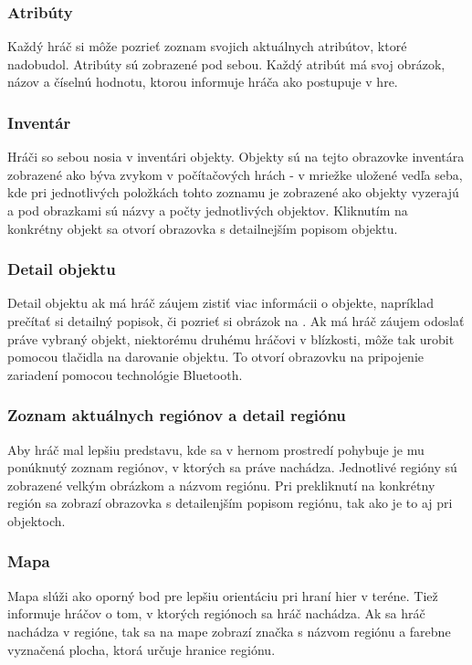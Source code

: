 \subsubsection{Atribúty}
Každý hráč si môže pozrieť zoznam svojich aktuálnych atribútov, ktoré nadobudol. Atribúty sú zobrazené pod sebou. Každý atribút má svoj obrázok, názov a číselnú hodnotu, ktorou informuje hráča ako postupuje v hre.

\subsubsection{Inventár}
Hráči so sebou nosia v inventári objekty. Objekty sú na tejto obrazovke inventára zobrazené ako býva zvykom v počítačových hrách - v mriežke uložené vedľa seba, kde pri jednotlivých položkách tohto zoznamu je zobrazené ako objekty vyzerajú a pod obrazkami sú názvy a počty jednotlivých objektov. Kliknutím na konkrétny objekt sa otvorí obrazovka s detailnejším popisom objektu.

\subsubsection{Detail objektu}
Detail objektu  ak má hráč záujem zistiť viac informácii o objekte, napríklad prečítať si detailný popisok, či pozrieť si obrázok na . Ak má hráč záujem odoslať práve vybraný objekt, niektorému druhému hráčovi v blízkosti, môže tak urobit pomocou tlačidla na darovanie objektu. To otvorí obrazovku na pripojenie zariadení pomocou technológie Bluetooth.

\subsubsection{Zoznam aktuálnych regiónov a detail regiónu}
Aby hráč mal lepšiu predstavu, kde sa v hernom prostredí pohybuje je mu ponúknutý zoznam regiónov, v ktorých sa práve nachádza. Jednotlivé regióny sú zobrazené velkým obrázkom a názvom regiónu. Pri prekliknutí na konkrétny región sa zobrazí obrazovka s detailenjším popisom regiónu, tak ako je to aj pri objektoch.

\subsubsection{Mapa}
Mapa slúži ako oporný bod  pre lepšiu orientáciu pri hraní hier v teréne. Tiež informuje hráčov o tom, v ktorých regiónoch sa hráč nachádza. Ak sa hráč nachádza v regióne, tak sa na mape zobrazí značka s názvom regiónu a farebne vyznačená plocha, ktorá určuje hranice regiónu.

